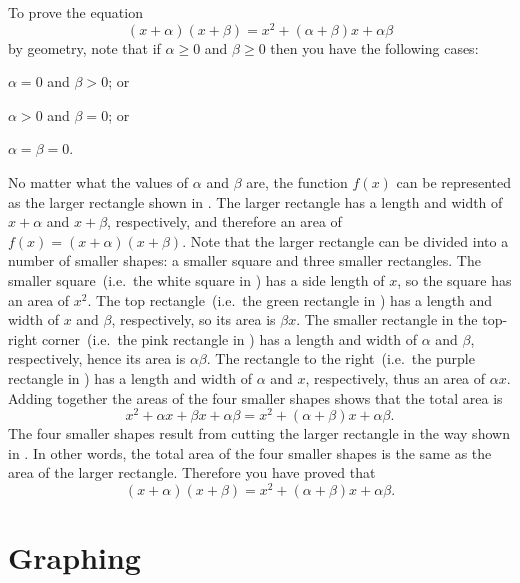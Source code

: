 \documentclass[a4paper,oneside,12pt]{article}
\begin{document}
To prove the equation
\[
(x + \alpha)(x + \beta)
=
x^2 + (\alpha + \beta)x + \alpha\beta
\]
by geometry, note that if $\alpha \geq 0$ and $\beta \geq 0$ then you
have the following cases:
\begin{packedenumeral}
\item $\alpha = 0$ and $\beta > 0$; or

\item $\alpha > 0$ and $\beta = 0$; or

\item $\alpha = \beta = 0$.
\end{packedenumeral}
No matter what the values of $\alpha$ and $\beta$ are, the function
$f(x)$ can be represented as the larger rectangle shown in
.  The larger rectangle has a
length and width of $x + \alpha$ and $x + \beta$, respectively, and
therefore an area of $f(x) = (x + \alpha)(x + \beta)$.  Note that the
larger rectangle can be divided into a number of smaller shapes: a
smaller square and three smaller rectangles.  The smaller
square~(i.e.~the white square in )
has a side length of $x$, so the square has an area of $x^2$.  The top
rectangle~(i.e.~the green rectangle in
) has a length and width of $x$ and
$\beta$, respectively, so its area is $\beta x$.  The smaller
rectangle in the top-right corner~(i.e.~the pink rectangle in
) has a length and width of
$\alpha$ and $\beta$, respectively, hence its area is $\alpha\beta$.
The rectangle to the right~(i.e.~the purple rectangle in
) has a length and width of
$\alpha$ and $x$, respectively, thus an area of $\alpha x$.  Adding
together the areas of the four smaller shapes shows that the total
area is
\[
x^2 + \alpha x + \beta x + \alpha\beta
=
x^2 + (\alpha + \beta)x + \alpha\beta.
\]
The four smaller shapes result from cutting the larger rectangle in
the way shown in .  In other words,
the total area of the four smaller shapes is the same as the area of
the larger rectangle.  Therefore you have proved that
\[
(x + \alpha) (x + \beta)
=
x^2 + (\alpha + \beta)x + \alpha\beta.
\]



\section{Graphing}
\label{sec:graphing}
\end{document}
